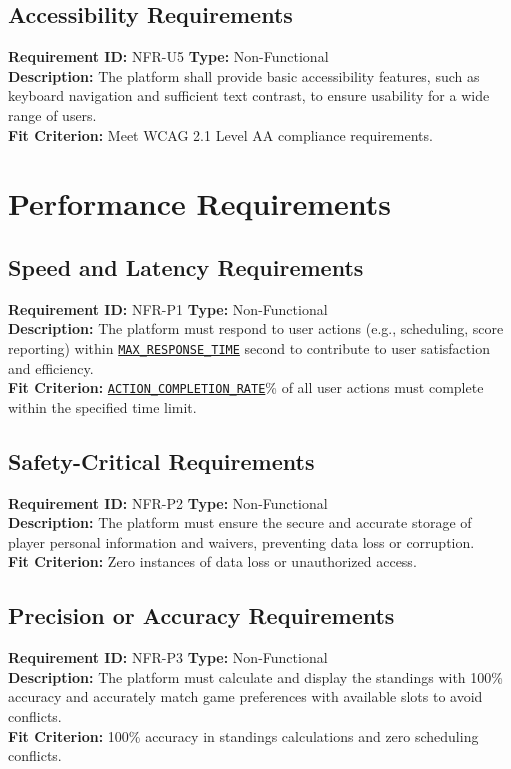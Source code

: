 \documentclass[12pt, titlepage]{article}
\begin{document}
\subsection{Accessibility Requirements}
\textbf{Requirement ID:} NFR-U5 \quad \textbf{Type:} Non-Functional \\
\textbf{Description:} The platform shall provide basic accessibility features, such as keyboard navigation and sufficient text contrast, to ensure usability for a wide range of users.\\
\textbf{Fit Criterion:} Meet WCAG 2.1 Level AA compliance requirements.

\section{Performance Requirements}
\subsection{Speed and Latency Requirements}
\textbf{Requirement ID:} NFR-P1 \quad \textbf{Type:} Non-Functional \\
\textbf{Description:} The platform must respond to user actions (e.g., scheduling, score reporting) within \hyperref[MAX_RESPONSE_TIME]{\texttt{MAX\_RESPONSE\_TIME}} second to contribute to user satisfaction and efficiency.\\
\textbf{Fit Criterion:} \hyperref[ACTION_COMPLETION_RATE]{\texttt{ACTION\_COMPLETION\_RATE}}\% of all user actions must complete within the specified time limit.

\subsection{Safety-Critical Requirements}
\textbf{Requirement ID:} NFR-P2 \quad \textbf{Type:} Non-Functional \\
\textbf{Description:} The platform must ensure the secure and accurate storage of player personal information and waivers, preventing data loss or corruption.\\
\textbf{Fit Criterion:} Zero instances of data loss or unauthorized access.

\subsection{Precision or Accuracy Requirements}
\textbf{Requirement ID:} NFR-P3 \quad \textbf{Type:} Non-Functional \\
\textbf{Description:} The platform must calculate and display the standings with 100\% accuracy and accurately match game preferences with available slots to avoid conflicts.\\
\textbf{Fit Criterion:} 100\% accuracy in standings calculations and zero scheduling conflicts.
\end{document}
